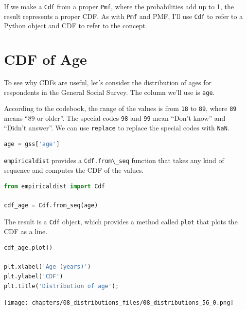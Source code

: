 If we make a \passthrough{\lstinline!Cdf!} from a proper
\passthrough{\lstinline!Pmf!}, where the probabilities add up to 1, the
result represents a proper CDF. As with \passthrough{\lstinline!Pmf!}
and PMF, I'll use \passthrough{\lstinline!Cdf!} to refer to a Python
object and CDF to refer to the concept.

\section{CDF of Age}\label{cdf-of-age}

To see why CDFs are useful, let's consider the distribution of ages for
respondents in the General Social Survey. The column we'll use is
\passthrough{\lstinline!age!}.

According to the codebook, the range of the values is from
\passthrough{\lstinline!18!} to \passthrough{\lstinline!89!}, where
\passthrough{\lstinline!89!} means ``89 or older''. The special codes
\passthrough{\lstinline!98!} and \passthrough{\lstinline!99!} mean
``Don't know'' and ``Didn't answer''. We can use
\passthrough{\lstinline!replace!} to replace the special codes with
\passthrough{\lstinline!NaN!}.

\begin{lstlisting}[language=Python,style=source]
age = gss['age']
\end{lstlisting}

\passthrough{\lstinline!empiricaldist!} provides a
\passthrough{\lstinline!Cdf.from\_seq!} function that takes any kind of
sequence and computes the CDF of the values.

\begin{lstlisting}[language=Python,style=source]
from empiricaldist import Cdf

cdf_age = Cdf.from_seq(age)
\end{lstlisting}

The result is a \passthrough{\lstinline!Cdf!} object, which provides a
method called \passthrough{\lstinline!plot!} that plots the CDF as a
line.

\begin{lstlisting}[language=Python,style=source]
cdf_age.plot()

plt.xlabel('Age (years)')
plt.ylabel('CDF')
plt.title('Distribution of age');
\end{lstlisting}

\begin{center}
\texttt{[image: chapters/08\_distributions\_files/08\_distributions\_56\_0.png]}
\end{center}

